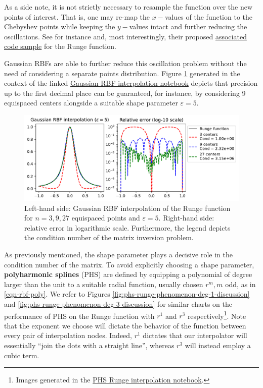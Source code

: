 \documentclass[12pt]{report} %
\begin{document}
As a side note,
it is not strictly necessary to resample the function over the new points of interest. That is, one may re-map the $x-$values of the function to the Chebyshev points while keeping the $y-$values intact and further reducing the oscillations. See for instance \cite{DEMARCHI2021125628} and, most interestingly, their proposed \href{https://github.com/pog87/FakeNodes/blob/master/Runge.ipynb}{associated code sample} for the Runge function.

Gaussian RBFs are able to further reduce this oscillation problem without the need of considering a separate points distribution. Figure \ref{fig:rbf-runge-phenomenon-eps-5-discussion} generated in the context of the linked \href{https://github.com/heqro/tfm-experiments/blob/main/introductory_notebooks/rbf_interpolation/runge_rbf.ipynb}{Gaussian RBF interpolation notebook} depicts that precision up to the first decimal place can be guaranteed, for instance, by considering 9 equispaced centers alongside a suitable shape parameter $\varepsilon=5$.

\begin{figure}[ht]
  \centering
  \includegraphics[width=\textwidth]{imagenes/rbf_interpolation/rbf_runge_5.pdf}
  \caption{Left-hand side: Gaussian RBF interpolation of the Runge function for $n=3,9,27$ equispaced points and $\varepsilon=5$. Right-hand side: relative error in logarithmic scale. Furthermore, the legend depicts the condition number of the matrix inversion problem.}
  \label{fig:rbf-runge-phenomenon-eps-5-discussion}
\end{figure}

As previously mentioned, the shape parameter plays a decisive role in the condition number of the matrix. 
To avoid explicitly choosing a shape parameter, \textbf{polyharmonic splines} (PHS) are defined by equipping a polynomial of degree larger than the unit to a suitable radial function, usually chosen $r^m,m$ odd, as in \eqref{eqn-rbf-poly}. We refer to Figures \ref{fig:phs-runge-phenomenon-deg-1-discussion} and \ref{fig:phs-runge-phenomenon-deg-3-discussion} for similar charts on the performance of PHS on the Runge function with $r^1$ and $r^3$ respectively\footnote{Images generated in the \href{https://github.com/heqro/tfm-experiments/blob/main/introductory_notebooks/rbf_interpolation/runge_phs.ipynb}{PHS Runge interpolation notebook}.}. Note that the exponent we choose will dictate the behavior of the function between every pair of interpolation nodes. Indeed, $r^1$ dictates that our interpolator will essentially ``join the dots with a straight line'', whereas $r^3$ will instead employ a cubic term.
\end{document}
